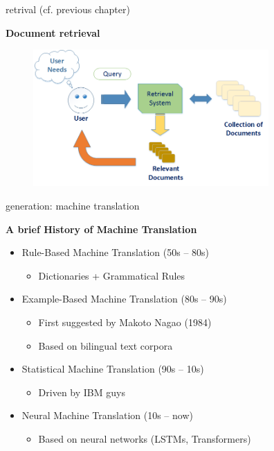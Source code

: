 
\begin{frame}{retrival (cf. previous chapter)}
	
\vfill

\textbf{Document retrieval}

\begin{figure}
	\centering
		\includegraphics[width = 9cm]{figure/retrieval.png}\\ 
\end{figure}

\vfill

	
\end{frame}


\begin{vbframe}{generation: machine translation}

\vfill

\textbf{A brief History of Machine Translation}

\begin{itemize}
	\item Rule-Based Machine Translation (50s -- 80s)
		\begin{itemize}
			\item Dictionaries + Grammatical Rules
		\end{itemize}
	\item Example-Based Machine Translation (80s -- 90s)
		\begin{itemize}
			\item First suggested by Makoto Nagao (1984)
			\item Based on bilingual text corpora
		\end{itemize}
	\item Statistical Machine Translation (90s -- 10s)
		\begin{itemize}
			\item Driven by IBM guys
		\end{itemize}
	\item Neural Machine Translation (10s -- now)
		\begin{itemize}
			\item Based on neural networks (LSTMs, Transformers)
		\end{itemize}
\end{itemize}

\vfill

\end{vbframe}

